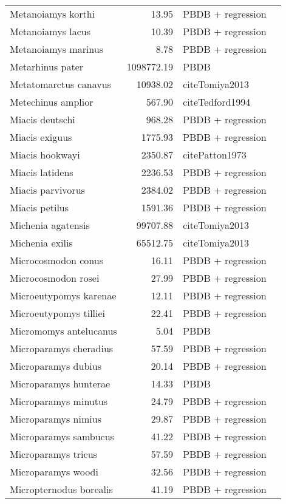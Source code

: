 \begin{table}[ht]
\begin{tabular}{lrll}
  Metanoiamys korthi & 13.95 & PBDB + regression &  \\ 
  Metanoiamys lacus & 10.39 & PBDB + regression &  \\ 
  Metanoiamys marinus & 8.78 & PBDB + regression &  \\ 
  Metarhinus pater & 1098772.19 & PBDB &  \\ 
  Metatomarctus canavus & 10938.02 & cite{Tomiya2013} &  \\ 
  Metechinus amplior & 567.90 & cite{Tedford1994} &  \\ 
  Miacis deutschi & 968.28 & PBDB + regression &  \\ 
  Miacis exiguus & 1775.93 & PBDB + regression &  \\ 
  Miacis hookwayi & 2350.87 & cite{Patton1973} &  \\ 
  Miacis latidens & 2236.53 & PBDB + regression &  \\ 
  Miacis parvivorus & 2384.02 & PBDB + regression &  \\ 
  Miacis petilus & 1591.36 & PBDB + regression &  \\ 
  Michenia agatensis & 99707.88 & cite{Tomiya2013} &  \\ 
  Michenia exilis & 65512.75 & cite{Tomiya2013} &  \\ 
  Microcosmodon conus & 16.11 & PBDB + regression &  \\ 
  Microcosmodon rosei & 27.99 & PBDB + regression &  \\ 
  Microeutypomys karenae & 12.11 & PBDB + regression &  \\ 
  Microeutypomys tilliei & 22.41 & PBDB + regression &  \\ 
  Micromomys antelucanus & 5.04 & PBDB &  \\ 
  Microparamys cheradius & 57.59 & PBDB + regression &  \\ 
  Microparamys dubius & 20.14 & PBDB + regression &  \\ 
  Microparamys hunterae & 14.33 & PBDB &  \\ 
  Microparamys minutus & 24.79 & PBDB + regression &  \\ 
  Microparamys nimius & 29.87 & PBDB + regression &  \\ 
  Microparamys sambucus & 41.22 & PBDB + regression &  \\ 
  Microparamys tricus & 57.59 & PBDB + regression &  \\ 
  Microparamys woodi & 32.56 & PBDB + regression &  \\ 
  Micropternodus borealis & 41.19 & PBDB + regression &  \\ 

\end{tabular}
\end{table}
